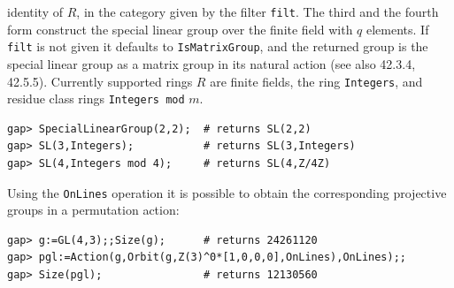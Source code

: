 \documentclass[11pt]{amsart}
\theoremstyle{plain}
\newcommand{\codesize}{\footnotesize}
\newcommand{\<}{\ensuremath{\langle}}
\renewcommand{\>}{\ensuremath{\rangle}}
\begin{document}
\begin{itemize}
identity of $R$, in the category given by the filter {\tt filt}. 
The third and the fourth form construct the special linear group over the finite field with $q$ elements.
If {\tt filt} is not given it defaults to {\tt IsMatrixGroup}, and the returned group is the special linear group as a
matrix group in its natural action (see also 42.3.4, 42.5.5).
Currently supported rings $R$ are finite fields, the ring {\tt Integers}, and residue
class rings {\tt Integers mod} $m$.
{\codesize
\begin{verbatim}
gap> SpecialLinearGroup(2,2);  # returns SL(2,2)
gap> SL(3,Integers);           # returns SL(3,Integers)
gap> SL(4,Integers mod 4);     # returns SL(4,Z/4Z)
\end{verbatim}}
\noindent Using the {\tt OnLines} operation it is possible to obtain the corresponding projective groups in a permutation
action:
{\codesize
\begin{verbatim}
gap> g:=GL(4,3);;Size(g);      # returns 24261120
gap> pgl:=Action(g,Orbit(g,Z(3)^0*[1,0,0,0],OnLines),OnLines);;
gap> Size(pgl);                # returns 12130560

\end{verbatim}}
\end{itemize}
\end{document}
